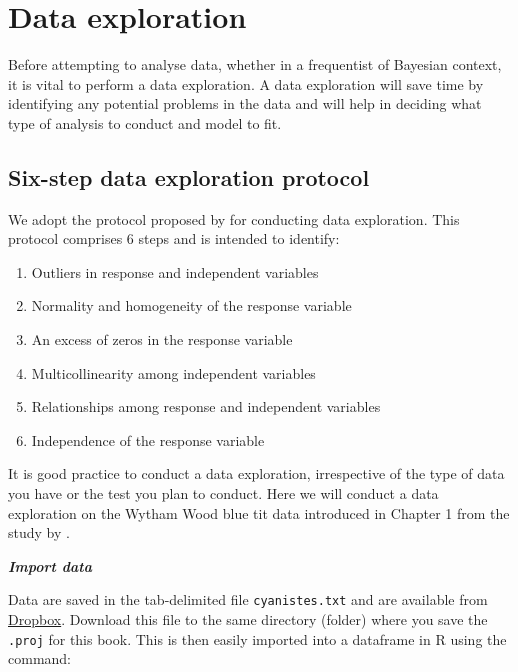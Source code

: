 \documentclass[
]{book}
\providecommand{\tightlist}{%
  \setlength{\itemsep}{0pt}\setlength{\parskip}{0pt}}
\begin{document}
\hypertarget{data-exploration}{%
\chapter{Data exploration}\label{data-exploration}}

Before attempting to analyse data, whether in a frequentist of Bayesian context, it is vital to perform a data exploration. A data exploration will save time by identifying any potential problems in the data and will help in deciding what type of analysis to conduct and model to fit.

\hypertarget{six-step-data-exploration-protocol}{%
\section{Six-step data exploration protocol}\label{six-step-data-exploration-protocol}}

We adopt the protocol proposed by \citet{Zuur_2009} for conducting data exploration. This protocol comprises 6 steps and is intended to identify:

\begin{enumerate}
\def\labelenumi{\arabic{enumi}.}
\tightlist
\item
  Outliers in response and independent variables
\item
  Normality and homogeneity of the response variable
\item
  An excess of zeros in the response variable
\item
  Multicollinearity among independent variables
\item
  Relationships among response and independent variables
\item
  Independence of the response variable
\end{enumerate}

It is good practice to conduct a data exploration, irrespective of the type of data you have or the test you plan to conduct. Here we will conduct a data exploration on the Wytham Wood blue tit data introduced in Chapter 1 from the study by \citet{O_Neill_2018}.

\emph{\textbf{Import data}}

Data are saved in the tab-delimited file \texttt{cyanistes.txt} and are available from \href{https://www.dropbox.com/s/5q3hdyxcouw6ifa/cyanistes.txt}{Dropbox}. Download this file to the same directory (folder) where you save the \texttt{.proj} for this book. This is then easily imported into a dataframe in R using the command:
\end{document}
